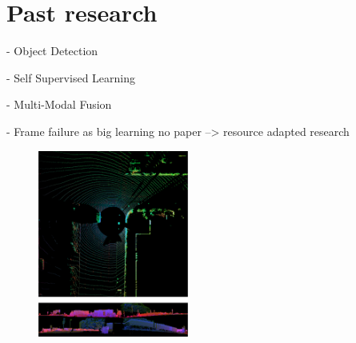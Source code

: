 \begin{minipage}[t]{504pt}
\begin{minipage}[t]{350pt}
\setlength{\parindent}{\myindent}
\setlength{\parskip}{\myparskip}

 \vspace*{-8pt}


 \section{Past research}
 - Object Detection

 - Self Supervised Learning

 - Multi-Modal Fusion

 - Frame failure as big learning no paper --> resource adapted research
 
\vspace*{-6pt}

\end{minipage}
\hspace{13pt}\begin{minipage}[t]{140pt}
\begin{figure}[H]
\includegraphics[width=140pt]{pic/fusion.png}
\end{figure}
\end{minipage}
\end{minipage}

